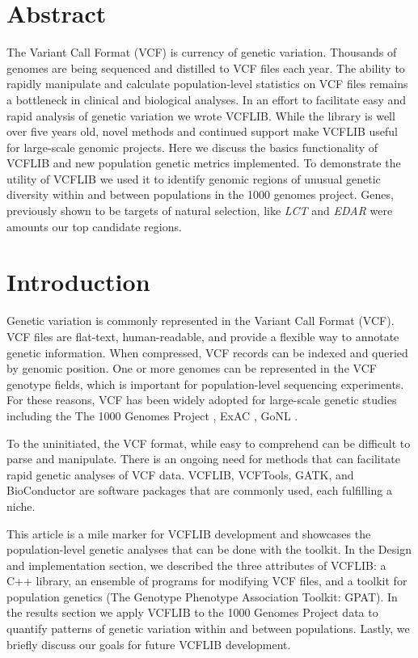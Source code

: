 \documentclass[10pt,letterpaper]{article}
\begin{document}
\section*{Abstract}

The Variant Call Format (VCF) is currency of genetic variation. Thousands of genomes are being sequenced and distilled to VCF files each year. The ability to rapidly manipulate and calculate population-level statistics on VCF files remains a bottleneck in clinical and biological analyses. In an effort to facilitate easy and rapid analysis of genetic variation we wrote VCFLIB. While the library is well over five years old, novel methods and continued support make VCFLIB useful for large-scale genomic projects. Here we discuss the basics functionality of VCFLIB and new population genetic metrics implemented.  To demonstrate the utility of VCFLIB we used it to identify genomic regions of unusual genetic diversity within and between populations in the 1000 genomes project.  Genes, previously shown to be targets of natural selection, like \textit{LCT} and \textit{EDAR} were amounts our top candidate regions. 

\linenumbers

\section*{Introduction}

Genetic variation is commonly represented in the Variant Call Format (VCF)\cite{vcftools}.  VCF files are flat-text, human-readable, and provide a flexible way to annotate genetic information.  When compressed, VCF records can be indexed and queried by genomic position\cite{tabix}. One or more genomes can be represented in the VCF genotype fields, which is important for population-level sequencing experiments. For these reasons, VCF has been widely adopted for large-scale genetic studies including the The 1000 Genomes Project \cite{1kg}, ExAC \cite{exac}, GoNL \cite{gonl}.

To the uninitiated, the VCF format, while easy to comprehend can be difficult to parse and manipulate. There is an ongoing need for methods that can facilitate rapid genetic analyses of VCF data.  VCFLIB, VCFTools\cite{vcftools}, GATK\cite{mckenna,depristo},  and BioConductor are software packages that are commonly used, each fulfilling a niche. 

This article is a mile marker for VCFLIB development and showcases the population-level genetic analyses that can be done with the toolkit. In the Design and implementation section, we described the three attributes of VCFLIB: a C++ library, an ensemble of programs for modifying VCF files, and a toolkit for population genetics (The Genotype Phenotype Association Toolkit: GPAT). In the results section we apply VCFLIB to the 1000 Genomes Project data to quantify patterns of genetic variation within and between populations.  Lastly, we briefly discuss our goals for future VCFLIB development.
\end{document}
